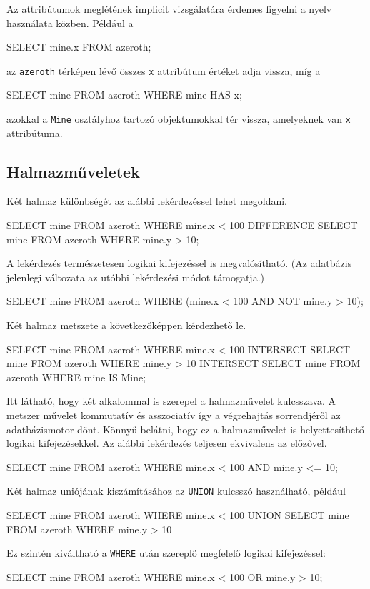 Az attribútumok meglétének implicit vizsgálatára érdemes figyelni a nyelv használata közben. Például a
\begin{sql}
SELECT mine.x FROM azeroth;
\end{sql}
az \texttt{azeroth} térképen lévő összes \texttt{x} attribútum értéket adja vissza, míg a
\begin{sql}
SELECT mine FROM azeroth WHERE mine HAS x;
\end{sql}
azokkal a \texttt{Mine} osztályhoz tartozó objektumokkal tér vissza, amelyeknek van \texttt{x} attribútuma.

\subsection{Halmazműveletek}

Két halmaz különbségét az alábbi lekérdezéssel lehet megoldani.
\begin{sql}
SELECT mine FROM azeroth WHERE mine.x < 100
    DIFFERENCE
SELECT mine FROM azeroth WHERE mine.y > 10; 
\end{sql}

A lekérdezés természetesen logikai kifejezéssel is megvalósítható. (Az adatbázis jelenlegi változata az utóbbi lekérdezési módot támogatja.)

\begin{sql}
SELECT mine FROM azeroth WHERE (mine.x < 100 AND NOT mine.y > 10); 
\end{sql}

Két halmaz metszete a következőképpen kérdezhető le.
\begin{sql}
SELECT mine FROM azeroth WHERE mine.x < 100
    INTERSECT
SELECT mine FROM azeroth WHERE mine.y > 10
    INTERSECT
SELECT mine FROM azeroth WHERE mine IS Mine;
\end{sql}
Itt látható, hogy két alkalommal is szerepel a halmazművelet kulcsszava. A metszer művelet kommutatív és asszociatív így a végrehajtás sorrendjéről az adatbázismotor dönt. Könnyű belátni, hogy ez a  halmazművelet is helyettesíthető logikai kifejezésekkel. Az alábbi lekérdezés teljesen ekvivalens az előzővel.
\begin{sql}
SELECT mine FROM azeroth WHERE mine.x < 100 AND mine.y <= 10;
\end{sql}

Két halmaz uniójának kiszámításához az \texttt{UNION} kulcsszó használható, például
\begin{sql}
SELECT mine FROM azeroth WHERE mine.x < 100
    UNION
SELECT mine FROM azeroth WHERE mine.y > 10
\end{sql}
Ez szintén kiváltható a \texttt{WHERE} után szereplő megfelelő logikai kifejezéssel:
\begin{sql}
SELECT mine FROM azeroth WHERE mine.x < 100 OR mine.y > 10;
\end{sql}

